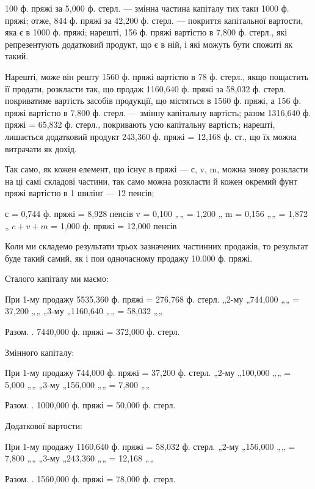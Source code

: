 \parcont{}  %
100 ф. пряжі за 5,000 ф. стерл. — змінна частина капіталу тих таки
1000 ф. пряжі; отже, 844 ф. пряжі за 42,200 ф. стерл. — покриття
капітальної вартости, яка є в 1000 ф. пряжі; нарешті, 156 ф. пряжі
вартістю в 7,800 ф. стерл., які репрезентують додатковий продукт, що
є в ній, і які можуть бути спожиті як такий.

Нарешті, може він решту 1560 ф. пряжі вартістю в 78 ф. стерл.,
якщо пощастить її продати, розкласти так, що продаж 1160,640 ф.
пряжі за 58,032 ф. стерл. покриватиме вартість засобів продукції, що
містяться в 1560 ф. пряжі, а 156 ф. пряжі вартістю в 7,800 ф. стерл. —
змінну капітальну вартість; разом 1316,640 ф. пряжі = 65,832 ф. стерл.,
покривають усю капітальну вартість; нарешті, лишається додатковий
продукт 243,360 ф. пряжі = 12,168 ф. ст., що їх можна витрачати як
дохід.

Так само, як кожен елемент, що існує в пряжі — с, v, m, можна
знову розкласти на ці самі складові частини, так само можна розкласти й
кожен окремий фунт пряжі вартістю в 1 шилінґ — 12 пенсів;

с = 0,744 ф. пряжі = 8,928 пенсів
v = 0,100 „„ = 1,200 „
m = 0,156 „„ = 1,872 „
$c + v + m$ = 1,000 ф. пряжі = 12,000 пенсів

Коли ми складемо результати трьох зазначених частинних продажів, то
результат буде такий самий, як і пои одночасному продажу 10.000 ф.
пряжі.

Сталого капіталу ми маємо:

При 1-му продажу 5535,360 ф. пряжі = 276,768 ф. стерл.
  „2-му „744,000 „„ = 37,200 „„
  „3-му „1160,640 „„ = 58,032 „„

                  Разом.  . 7440,000 ф. пряжі = 372,000    ф. стерл.

Змінного капіталу:

При 1-му продажу 744,000 ф. пряжі = 37,200 ф. стерл.
  „2-му „100,000 „„ = 5,000 „„
  „3-му „156,000 „„ = 7,800 „„

                Разом.  . 1000,000 ф. пряжі = 50,000 ф. стерл.

Додаткової вартости:

При 1-му продажу 1160,640 ф. пряжі = 58,032    ф. стерл.
  „2-му „156,000 „„ = 7,800 „„
  „3-му „243,360 „„ = 12,168 „„

                  Разом.  . 1560,000 ф. пряжі = 78,000 ф. стерл.
\parbreak{}  %
